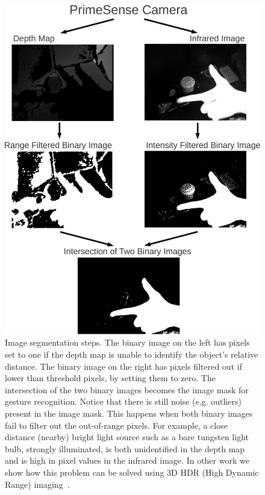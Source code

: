 \begin{figure} 
\centering 
\includegraphics[width=0.8\columnwidth]{ch5/figs/crop_segmentation.pdf} 
\caption{Image segmentation steps. The binary image on the left has pixels
set to one if the depth map is unable to identify the object's relative
distance. The binary image on the right has pixels filtered out if lower than
threshold pixels, by setting them to zero. The intersection of the two
binary images becomes the image mask for gesture recognition. Notice that
there is still noise (e.g. outliers) present in the image mask. This happens
when both binary images fail to filter out the out-of-range pixels. For
example, a close distance (nearby) bright light source such as a bare tungsten
light bulb, strongly illuminated,
is both unidentified in the
depth map and is high in pixel values in the infrared image.
In other work we show how this problem can be solved using 3D HDR (High Dynamic
Range) imaging~\cite{lo2013augmediated}.}
\label{image_segmentation} 
\end{figure}

